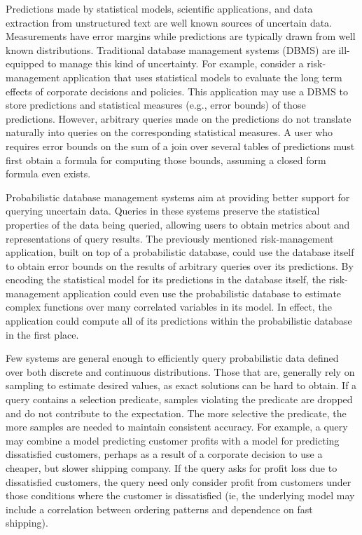 Predictions made by statistical models, scientific applications, and data extraction from unstructured text are well known sources of uncertain data.  Measurements have error margins while predictions are typically drawn from well known distributions.  Traditional database management systems (DBMS) are ill-equipped to manage this kind of uncertainty.  For example, consider a risk-management application that uses statistical models to evaluate the long term effects of corporate decisions and policies.  This application may use a DBMS to store predictions and statistical measures (e.g., error bounds) of those predictions.  However, arbitrary queries made on the predictions do not translate naturally into queries on the corresponding statistical measures.  A user who requires error bounds on the sum of a join over several tables of predictions must first obtain a formula for computing those bounds, assuming a closed form formula even exists.

Probabilistic  database  management  systems \cite{CKP2003, dalvi07efficient, WidomTrio2008, DM2006, KochMayBMS2008, SD2007, ORION, MCDB, BayesStore} aim at providing better support for querying uncertain data.  Queries in these systems preserve the statistical properties of the data being queried, allowing users to obtain metrics about and representations of query results.  The previously mentioned risk-management application, built on top of a probabilistic database, could use the database itself to obtain error bounds on the results of arbitrary queries over its predictions.  By encoding the statistical model for its predictions in the database itself, the risk-management application could even use the probabilistic database to estimate complex functions over many correlated variables in its model.  In effect, the application could compute all of its predictions within the probabilistic database in the first place.

Few systems are general enough to efficiently query probabilistic data defined over both discrete and continuous distributions.  Those that are, generally rely on sampling to estimate desired values, as exact solutions can be hard to obtain.  If a query contains a selection predicate, samples violating the predicate are dropped and do not contribute to the expectation.  The more selective the predicate, the more samples are needed to maintain consistent accuracy.  For example, a query may combine a model predicting customer profits with a model for predicting dissatisfied customers, perhaps as a result of a corporate decision to use a cheaper, but slower shipping company.  If the query asks for profit loss due to dissatisfied customers, the query need only consider profit from customers under those conditions where the customer is dissatisfied (ie, the underlying model may include a correlation between ordering patterns and dependence on fast shipping).  

